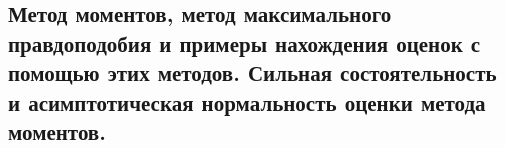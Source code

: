 \subsection{Метод моментов, метод максимального правдоподобия и примеры нахождения оценок с помощью этих методов. Сильная состоятельность и асимптотическая нормальность оценки метода моментов.}
